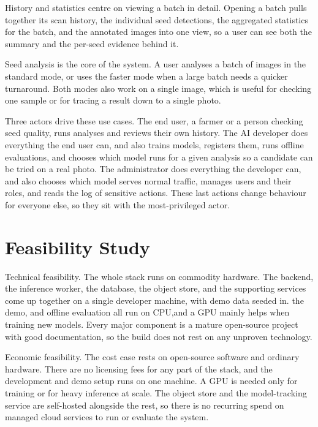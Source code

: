 History and statistics centre on viewing a batch in detail. Opening a batch pulls
together its scan history, the individual seed detections, the aggregated
statistics for the batch, and the annotated images into one view, so a user can
see both the summary and the per-seed evidence behind it.

Seed analysis is the core of the system. A user analyses a batch of images in the
standard mode, or uses the faster mode when a large batch needs a quicker
turnaround. Both modes also work on a single image, which is useful for checking
one sample or for tracing a result down to a single photo.

Three actors drive these use cases. The end user, a farmer or a person checking
seed quality, runs analyses and reviews their own history. The AI developer does
everything the end user can, and also trains models, registers them, runs offline
evaluations, and chooses which model runs for a given analysis so a candidate can
be tried on a real photo. The administrator does everything the developer can,
and also chooses which model serves normal traffic, manages users and their
roles, and reads the log of sensitive actions. These last actions change
behaviour for everyone else, so they sit with the most-privileged actor.


\section{Feasibility Study}

Technical feasibility. The whole stack runs on commodity hardware. The backend,
the inference worker, the database, the object store, and the supporting services
come up together on a single developer machine, with demo data seeded in. the demo,
and offline evaluation all run on CPU,and a GPU mainly helps when training new models.
Every major component is a mature
open-source project with good documentation, so the build does not rest on any
unproven technology.

Economic feasibility. The cost case rests on open-source software and ordinary
hardware. There are no licensing fees for any part of the stack, and the
development and demo setup runs on one machine. A GPU is needed only for training
or for heavy inference at scale. The object store and
the model-tracking service are self-hosted alongside the rest, so there is no
recurring spend on managed cloud services to run or evaluate the system.

